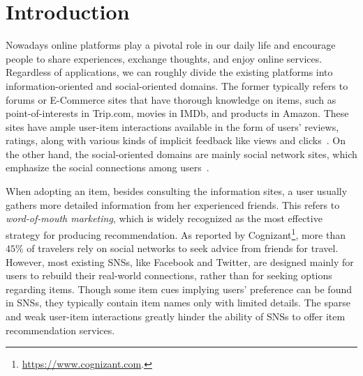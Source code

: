 \documentclass[sigconf]{acmart}
\begin{document}
\vspace{-5pt}

 \vspace{-5pt}
\maketitle

\section{Introduction}
Nowadays online platforms play a pivotal role in our daily life and encourage people to share experiences, exchange thoughts, and enjoy online services.
Regardless of applications, we can roughly divide the existing platforms into information-oriented and social-oriented domains.
The former typically refers to forums or E-Commerce sites that have thorough knowledge on items, such as point-of-interests in Trip.com, movies in IMDb, and products in Amazon. These sites have ample user-item interactions available in the form of users' reviews, ratings, along with various kinds of implicit feedback like views and clicks~\cite{iCD}.
On the other hand, the social-oriented domains are mainly social network sites, which emphasize the social connections among users~\cite{SNE}.

When adopting an item, besides consulting the information sites, a user usually gathers more detailed information from her experienced friends. This refers to \emph{word-of-mouth marketing}, which is widely recognized as the most effective strategy for producing recommendation.
As reported by Cognizant\footnote{\url{https://www.cognizant.com}.}, more than $45\%$ of travelers rely on social networks to seek advice from friends for travel.
However, most existing SNSs, like Facebook and Twitter, are designed mainly for users to rebuild their real-world connections, rather than for seeking options regarding items.
Though some item cues implying users' preference can be found in SNSs, they typically contain item names only with limited details.
The sparse and weak user-item interactions greatly hinder the ability of SNSs to offer item recommendation services.
\end{document}
